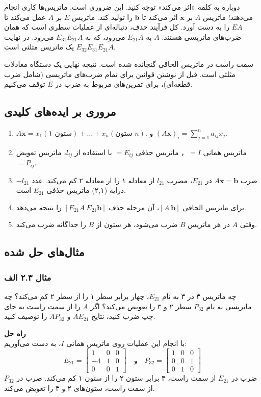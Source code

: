 \documentclass[12pt, a4paper]{book}
\begin{document}
	دوباره به کلمه «اثر می‌کند» توجه کنید. این ضروری است. ماتریس‌ها کاری انجام می‌دهند! ماتریس $A$ بر $\mathbf{x}$ اثر می‌کند تا $\mathbf{b}$ را تولید کند. ماتریس $E$ بر $A$ عمل می‌کند تا $EA$ را به دست آورد. کل فرآیند حذف، دنباله‌ای از عملیات سطری است که همان ضرب‌های ماتریسی هستند. $A$ به $E_{21}A$ می‌رود، که به $E_{31}E_{21}A$ می‌رود. در نهایت $E_{32}E_{31}E_{21}A$ یک ماتریس مثلثی است.
	
	سمت راست در ماتریس الحاقی گنجانده شده است. نتیجه نهایی یک دستگاه معادلات مثلثی است. قبل از نوشتن قوانین برای تمام ضرب‌های ماتریسی (شامل ضرب قطعه‌ای)، برای تمرین‌های مربوط به ضرب در $E$ توقف می‌کنیم.
	
	\subsection*{مروری بر ایده‌های کلیدی}
	\begin{enumerate}
		\item $A\mathbf{x} = x_1(\text{ستون ۱}) + \dots + x_n(\text{ستون } n)$. و $(A\mathbf{x})_i = \sum_{j=1}^{n} a_{ij}x_j$.
		\item ماتریس همانی $= I$， ماتریس حذفی $= E_{ij}$ با استفاده از $l_{ij}$، ماتریس تعویض $= P_{ij}$.
		\item ضرب $A\mathbf{x}=\mathbf{b}$ در $E_{21}$، مضرب $l_{21}$ از معادله ۱ را از معادله ۲ کم می‌کند. عدد $-l_{21}$ درایه (۲,۱) ماتریس حذفی $E_{21}$ است.
		\item برای ماتریس الحاقی $[A \ \mathbf{b}]$، آن مرحله حذف $[E_{21}A \ E_{21}\mathbf{b}]$ را نتیجه می‌دهد.
		\item وقتی $A$ در هر ماتریس $B$ ضرب می‌شود، هر ستون از $B$ را جداگانه ضرب می‌کند.
	\end{enumerate}
	
	\subsection*{مثال‌های حل شده}
	\subsubsection*{مثال ۲.۳ الف}
	چه ماتریس ۳ در ۳ به نام $E_{21}$، چهار برابر سطر ۱ را از سطر ۲ کم می‌کند؟ چه ماتریسی به نام $P_{32}$ سطر ۲ و ۳ را تعویض می‌کند؟ اگر $A$ را از سمت راست به جای چپ ضرب کنید، نتایج $AE_{21}$ و $AP_{32}$ را توصیف کنید.
	
	\textbf{راه حل} \\
	با انجام این عملیات روی ماتریس همانی $I$، به دست می‌آوریم:
	\[
	E_{21} = \begin{bmatrix} 1 & 0 & 0 \\ -4 & 1 & 0 \\ 0 & 0 & 1 \end{bmatrix} \quad \text{و} \quad
	P_{32} = \begin{bmatrix} 1 & 0 & 0 \\ 0 & 0 & 1 \\ 0 & 1 & 0 \end{bmatrix}
	\]
	ضرب در $E_{21}$ از سمت راست، ۴ برابر ستون ۲ را از ستون ۱ کم می‌کند.
	ضرب در $P_{32}$ از سمت راست، ستون‌های ۲ و ۳ را تعویض می‌کند.
	
\end{document}
